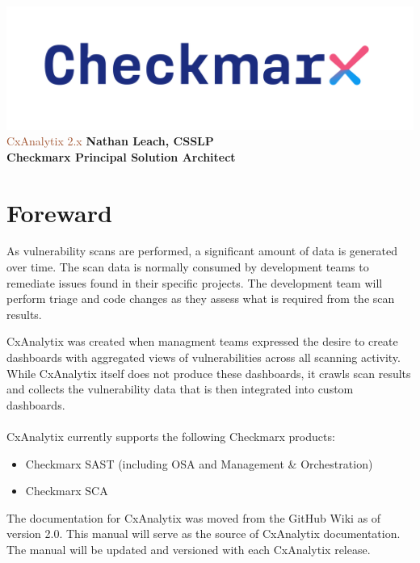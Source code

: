 \documentclass[a4paper, 11pt, oneside]{book}
\begin{document}
\begin{titlepage}
    \thispagestyle{empty}
    \centering
    \includegraphics[scale=.4]{graphics/cx_logo-dark.png}
    \vfill
    \textcolor{Sienna}{\Huge CxAnalytix 2.x}
    \vfill
    {\Large\textbf{Nathan Leach, CSSLP\\Checkmarx Principal Solution Architect}}
\end{titlepage}

\newpage


\tableofcontents

\chapter*{Foreward}

As vulnerability scans are performed, a significant amount of data is generated over time.  The
scan data is normally consumed by development teams to remediate issues found in their specific 
projects.  The development team will perform triage and code changes as they assess what is required 
from the scan results. 

CxAnalytix was created when managment teams expressed the desire to create dashboards with
aggregated views of vulnerabilities across all scanning activity.  While CxAnalytix itself
does not produce these dashboards, it crawls scan results and collects the vulnerability
data that is then integrated into custom dashboards.\\\\

CxAnalytix currently supports the following Checkmarx products:

\begin{itemize}
    \item Checkmarx SAST (including OSA and Management \& Orchestration)
    \item Checkmarx SCA
\end{itemize}

The documentation for CxAnalytix was moved from the GitHub Wiki as of version 2.0.  This
manual will serve as the source of CxAnalytix documentation.  The manual will be updated
and versioned with each CxAnalytix release.
\end{document}
